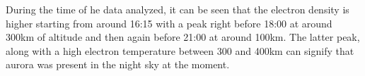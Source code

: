 During the time of he data analyzed, it can be seen that the electron density is higher starting from around 16:15 with a peak right before 18:00 at around 300km of altitude and then again before 21:00 at around 100km. The latter peak, along with a high electron temperature between 300 and 400km can signify that aurora was present in the night sky at the moment.